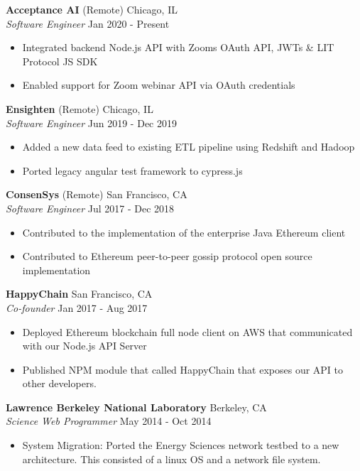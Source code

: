 \documentclass[a4paper]{article}
\begin{document}
\textbf{Acceptance AI} \hfill (Remote) Chicago, IL\\
\textit{Software Engineer} \hfill Jan 2020 - Present\\
\vspace{-1mm}
\begin{itemize} \itemsep 1pt
	\item Integrated backend Node.js API with Zoom\textquotesingle{}s OAuth API, JWTs \& LIT Protocol JS SDK
	\item Enabled support for Zoom webinar API via OAuth credentials
\end{itemize}
\textbf{Ensighten} \hfill (Remote) Chicago, IL\\
\textit{Software Engineer} \hfill Jun 2019 - Dec 2019\\
\vspace{-1mm}
\begin{itemize} \itemsep 1pt
	\item Added a new data feed to existing ETL pipeline using Redshift and Hadoop
	\item Ported legacy angular test framework to cypress.js
\end{itemize}
\textbf{ConsenSys} \hfill (Remote) San Francisco, CA\\
\textit{Software Engineer} \hfill Jul 2017 - Dec 2018\\
\vspace{-1mm}
\begin{itemize} \itemsep 1pt
	\item Contributed to the implementation of the enterprise Java Ethereum client
	\item Contributed to Ethereum peer-to-peer gossip protocol open source implementation
\end{itemize}
\textbf{HappyChain} \hfill San Francisco, CA\\
\textit{Co-founder} \hfill Jan 2017 - Aug 2017\\
\vspace{-1mm}
\begin{itemize} \itemsep 1pt
	\item Deployed Ethereum blockchain full node client on AWS that communicated with our Node.js API Server
	\item Published NPM module that called HappyChain that exposes our API to other developers.
\end{itemize}
\textbf{Lawrence Berkeley National Laboratory} \hfill Berkeley, CA\\
\textit{Science Web Programmer} \hfill May 2014 - Oct 2014\\
\vspace{-1mm}
\begin{itemize} \itemsep 1pt
	\item System Migration: Ported the Energy Sciences network testbed to a new architecture. This consisted of a linux OS and a network file system.
\end{itemize}
\end{document}
